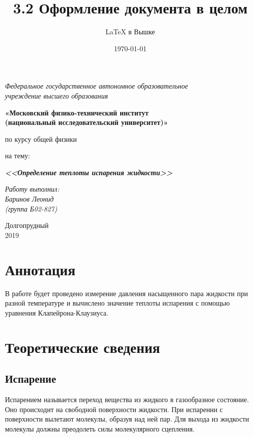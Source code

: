 \documentclass[a4paper,12pt]{article}
\author{\LaTeX{} в Вышке}
\title{3.2 Оформление документа в целом}
\date{\today}
\theoremstyle{plain} %
\theoremstyle{definition} %
\theoremstyle{remark} %
\begin{document}
	\thispagestyle{empty}
	\begin{center}
		\textit{Федеральное государственное автономное образовательное\\ учреждение высшего образования }
		\vspace{0.5ex}
		
		\textbf{«Московский физико-технический институт\\ (национальный исследовательский университет)»}
	\end{center}
	\vspace{10ex}
	\begin{center}
		\vspace{13ex}
		\vspace{1ex}
		
		по курсу общей физики
		
		
		на тему:
		
		\textbf{\textit{<<Определение теплоты испарения жидкости>>}}
		\vspace{30ex}
		\begin{flushright}
			\noindent
			\textit{Работу выполнил:}
			\\
			\textit{Баринов Леонид \\(группа Б02-827)}
		\end{flushright}
		\vfill
		Долгопрудный \\2019
	\end{center}
	\newpage
	\setcounter{page}{1}
	\fancyhead[R]{\nouppercase{\leftmark}}
	\section{Аннотация}
	В работе будет проведено измерение давления насыщенного пара жидкости при разной температуре и вычислено значение теплоты испарения с помощью уравнения Клапейрона-Клаузиуса.
	\section {Теоретические сведения}
	\subsection{Испарение}
	Испарением называется переход вещества из жидкого в газообразное состояние. Оно происходит на свободной поверхности жидкости. При испарении с поверхности вылетают молекулы, образуя над ней пар. Для выхода из жидкости молекулы должны преодолеть силы молекулярного сцепления. 
\end{document}
